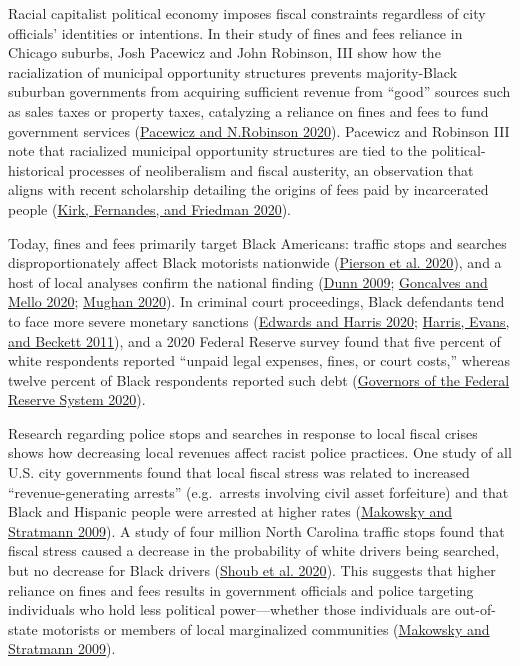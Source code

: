 \documentclass[
  12pt,
]{article}
\begin{document}
Racial capitalist political economy imposes fiscal constraints regardless of city officials' identities or intentions. In their study of fines and fees reliance in Chicago suburbs, Josh Pacewicz and John Robinson, III show how the racialization of municipal opportunity structures prevents majority-Black suburban governments from acquiring sufficient revenue from ``good'' sources such as sales taxes or property taxes, catalyzing a reliance on fines and fees to fund government services (\protect\hyperlink{ref-Pacewicz2020}{Pacewicz and N.Robinson 2020}). Pacewicz and Robinson III note that racialized municipal opportunity structures are tied to the political-historical processes of neoliberalism and fiscal austerity, an observation that aligns with recent scholarship detailing the origins of fees paid by incarcerated people (\protect\hyperlink{ref-Kirk2020}{Kirk, Fernandes, and Friedman 2020}).

Today, fines and fees primarily target Black Americans: traffic stops and searches disproportionately affect Black motorists nationwide (\protect\hyperlink{ref-Pierson2020}{Pierson et al. 2020}), and a host of local analyses confirm the national finding (\protect\hyperlink{ref-Dunn2009}{Dunn 2009}; \protect\hyperlink{ref-Goncalves2020}{Goncalves and Mello 2020}; \protect\hyperlink{ref-Mughan2020}{Mughan 2020}). In criminal court proceedings, Black defendants tend to face more severe monetary sanctions (\protect\hyperlink{ref-Edwards2020}{Edwards and Harris 2020}; \protect\hyperlink{ref-Harris2011}{Harris, Evans, and Beckett 2011}), and a 2020 Federal Reserve survey found that five percent of white respondents reported ``unpaid legal expenses, fines, or court costs,'' whereas twelve percent of Black respondents reported such debt (\protect\hyperlink{ref-BoardofGovernorsoftheFederalReserveSystem2020}{Governors of the Federal Reserve System 2020}).

Research regarding police stops and searches in response to local fiscal crises shows how decreasing local revenues affect racist police practices. One study of all U.S. city governments found that local fiscal stress was related to increased ``revenue-generating arrests'' (e.g.~arrests involving civil asset forfeiture) and that Black and Hispanic people were arrested at higher rates (\protect\hyperlink{ref-Makowsky2009}{Makowsky and Stratmann 2009}). A study of four million North Carolina traffic stops found that fiscal stress caused a decrease in the probability of white drivers being searched, but no decrease for Black drivers (\protect\hyperlink{ref-Shoub2020}{Shoub et al. 2020}). This suggests that higher reliance on fines and fees results in government officials and police targeting individuals who hold less political power---whether those individuals are out-of-state motorists or members of local marginalized communities (\protect\hyperlink{ref-Makowsky2009}{Makowsky and Stratmann 2009}).
\end{document}
